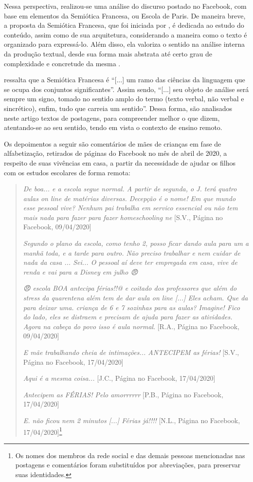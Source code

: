 \documentclass{textolivre}
\begin{document}
Nessa perspectiva, realizou-se uma análise do discurso postado no Facebook, com base em elementos da Semiótica Francesa, ou Escola de Paris. De maneira breve, a proposta da Semiótica Francesa, que foi iniciada por \textcite{greimas_sobre_1975}, é dedicada ao estudo do conteúdo, assim como de sua arquitetura, considerando a maneira como o texto é organizado para expressá-lo. Além disso, ela valoriza o sentido na análise interna da produção textual, desde sua forma mais abstrata até certo grau de complexidade e concretude da mesma \cite{bertrand_caminhos_2003, brito__2012, pereira_o_2016}. 

\textcite[p. 2]{silva_avancos_2011} ressalta que a Semiótica Francesa é “[...] um ramo das ciências da linguagem que se ocupa dos conjuntos significantes”. Assim sendo, “[...] seu objeto de análise será sempre um signo, tomado no sentido amplo do termo (texto verbal, não verbal e sincrético), enfim, tudo que carreia um sentido”. Dessa forma, são analisados neste artigo textos de postagens, para compreender melhor o que dizem, atentando-se ao seu sentido, tendo em vista o contexto de ensino remoto.

Os depoimentos a seguir são comentários de mães de crianças em fase de alfabetização, retirados de páginas do Facebook no mês de abril de 2020, a respeito de suas vivências em casa, a partir da necessidade de ajudar os filhos com os estudos escolares de forma remota:

\begin{quote}
\textit{De boa... e a escola segue normal. A partir de segunda, o J. terá quatro aulas on line de matérias diversas. Decepção é o nome! Em que mundo esse pessoal vive? Nenhum pai trabalha em servico essencial ou não tem mais nada para fazer para fazer homeschooling ne} [S.V., Página no Facebook, 09/04/2020]

\textit{Segundo o plano da escola, como tenho 2, posso ficar dando aula para um a manhã toda, e a tarde para outro. Não preciso trabalhar e nem cuidar de nada da casa ... Sei... O pessoal aí deve ter empregada em casa, vive de renda e vai para a Disney em julho {\Symbola 😠} }

\textit{{\Symbola 😠} escola BOA antecipa férias!!@ e coitado dos professores que além do stress da quarentena além tem de dar aula on line [...] Eles acham. Que da para deixar uma. criança de 6 e 7 sozinhas para as aulas? Imagine! Fico do lado, eles se distraem e precisam de ajuda para fazer as atividades. Agora na cabeça do povo isso é aula normal}. [R.A., Página no Facebook, 09/04/2020]

\textit{E mãe trabalhando cheia de intimações... ANTECIPEM as férias!} [S.V., Página no Facebook, 17/04/2020]

\textit{Aqui é a mesma coisa...} [J.C., Página no Facebook, 17/04/2020]

\textit{Antecipem as FÉRIAS! Pelo amorrrrrr} [P.B., Página no Facebook, 17/04/2020]

\textit{E. não ficou nem 2 minutos [...] Férias já!!!!} [N.L., Página no Facebook, 17/04/2020]\footnote{Os nomes dos membros da rede social e das demais pessoas mencionadas nas postagens e comentários foram substituídos por abreviações, para preservar suas identidades.}
\end{quote}
\end{document}
